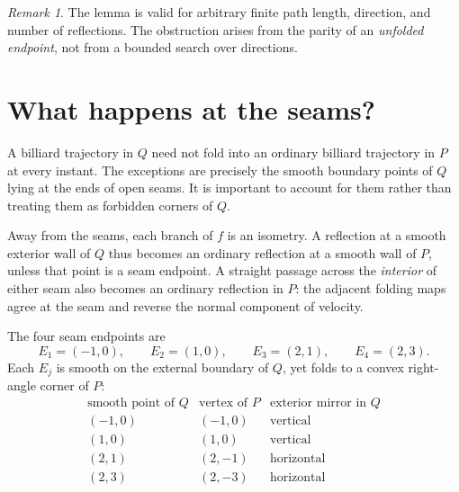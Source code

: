 \documentclass[11pt]{article}
\theoremstyle{remark}
\newtheorem{remark}{Remark}
\begin{document}
\begin{remark}
The lemma is valid for arbitrary finite path length, direction, and number of reflections. The obstruction arises from the parity of an \emph{unfolded endpoint}, not from a bounded search over directions.
\end{remark}

\section{What happens at the seams?}
A billiard trajectory in $Q$ need not fold into an ordinary billiard trajectory in $P$ at every instant. The exceptions are precisely the smooth boundary points of $Q$ lying at the ends of open seams. It is important to account for them rather than treating them as forbidden corners of $Q$.

Away from the seams, each branch of $f$ is an isometry. A reflection at a smooth exterior wall of $Q$ thus becomes an ordinary reflection at a smooth wall of $P$, unless that point is a seam endpoint. A straight passage across the \emph{interior} of either seam also becomes an ordinary reflection in $P$: the adjacent folding maps agree at the seam and reverse the normal component of velocity.

The four seam endpoints are
\begin{equation}\label{eq:exceptional}
E_1=(-1,0),\qquad E_2=(1,0),\qquad
E_3=(2,1),\qquad E_4=(2,3).
\end{equation}
Each $E_j$ is smooth on the external boundary of $Q$, yet folds to a convex right-angle corner of $P$:
\[
\begin{array}{c|c|c}
\text{smooth point of }Q & \text{vertex of }P & \text{exterior mirror in }Q\\ \hline
(-1,0) & (-1,0) & \text{vertical}\\
(1,0) & (1,0) & \text{vertical}\\
(2,1) & (2,-1) & \text{horizontal}\\
(2,3) & (2,-3) & \text{horizontal}
\end{array}
\]
\end{document}
